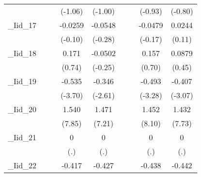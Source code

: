 {\begin{tabular}{l*{8}{c}}
            &                     &                     &     (-1.06)         &     (-1.00)         &                     &                     &     (-0.93)         &     (-0.80)         \\
[1em]
\_Iid\_17     &                     &                     &     -0.0259         &     -0.0548         &                     &                     &     -0.0479         &      0.0244         \\
            &                     &                     &     (-0.10)         &     (-0.28)         &                     &                     &     (-0.17)         &      (0.11)         \\
[1em]
\_Iid\_18     &                     &                     &       0.171         &     -0.0502         &                     &                     &       0.157         &      0.0879         \\
            &                     &                     &      (0.74)         &     (-0.25)         &                     &                     &      (0.70)         &      (0.45)         \\
[1em]
\_Iid\_19     &                     &                     &      -0.535\sym{***}&      -0.346\sym{**} &                     &                     &      -0.493\sym{**} &      -0.407\sym{**} \\
            &                     &                     &     (-3.70)         &     (-2.61)         &                     &                     &     (-3.28)         &     (-3.07)         \\
[1em]
\_Iid\_20     &                     &                     &       1.540\sym{***}&       1.471\sym{***}&                     &                     &       1.452\sym{***}&       1.432\sym{***}\\
            &                     &                     &      (7.85)         &      (7.21)         &                     &                     &      (8.10)         &      (7.73)         \\
[1em]
\_Iid\_21     &                     &                     &           0         &           0         &                     &                     &           0         &           0         \\
            &                     &                     &         (.)         &         (.)         &                     &                     &         (.)         &         (.)         \\
[1em]
\_Iid\_22     &                     &                     &      -0.417\sym{***}&      -0.427\sym{**} &                     &                     &      -0.438\sym{***}&      -0.442\sym{***}\\

\end{tabular}}
